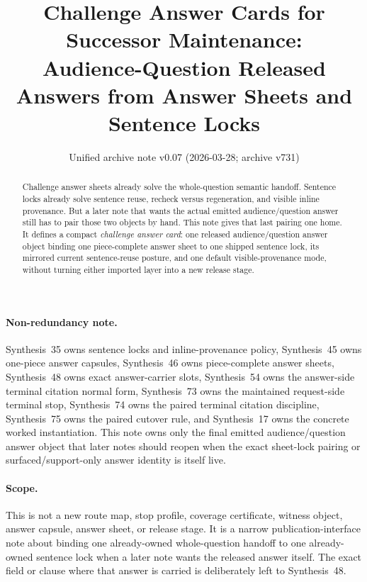 \documentclass[11pt]{article}
\title{Challenge Answer Cards for Successor Maintenance:\\[0.5ex]
\large Audience-Question Released Answers from Answer Sheets and Sentence Locks}
\author{}
\date{Unified archive note v0.07 (2026-03-28; archive v731)}
\begin{document}
\maketitle

\begin{abstract}
Challenge answer sheets already solve the whole-question semantic handoff.
Sentence locks already solve sentence reuse, recheck versus regeneration, and visible inline provenance.
But a later note that wants the actual emitted audience/question answer still has to pair those two objects by hand.
This note gives that last pairing one home.
It defines a compact \emph{challenge answer card}: one released audience/question answer object binding one piece-complete answer sheet to one shipped sentence lock, its mirrored current sentence-reuse posture, and one default visible-provenance mode, without turning either imported layer into a new release stage.
\end{abstract}

\paragraph{Non-redundancy note.}
Synthesis~35 owns sentence locks and inline-provenance policy, Synthesis~45 owns one-piece answer capsules, Synthesis~46 owns piece-complete answer sheets, Synthesis~48 owns exact answer-carrier slots, Synthesis~54 owns the answer-side terminal citation normal form, Synthesis~73 owns the maintained request-side terminal stop, Synthesis~74 owns the paired terminal citation discipline, Synthesis~75 owns the paired cutover rule, and Synthesis~17 owns the concrete worked instantiation.
This note owns only the final emitted audience/question answer object that later notes should reopen when the exact sheet-lock pairing or surfaced/support-only answer identity is itself live.

\paragraph{Scope.}
This is not a new route map, stop profile, coverage certificate, witness object, answer capsule, answer sheet, or release stage.
It is a narrow publication-interface note about binding one already-owned whole-question handoff to one already-owned sentence lock when a later note wants the released answer itself. The exact field or clause where that answer is carried is deliberately left to Synthesis~48.
\end{document}

